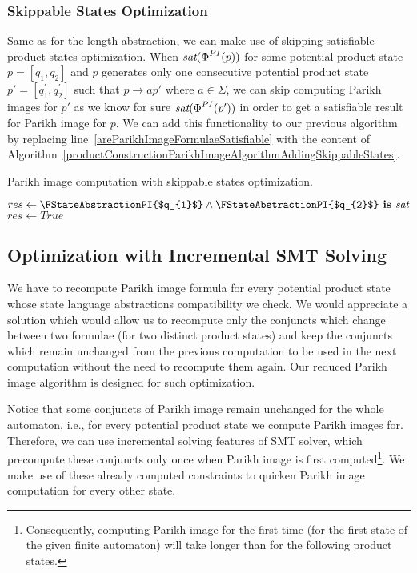 \subsubsection{Skippable States Optimization}

Same as for the length abstraction, we can make use of skipping satisfiable product states optimization. When $\emph{sat}(\emph{$\Phi$}^{PI}(p))$ for some potential product state $p = [q_1, q_2]$ and $p$ generates only one consecutive potential product state $p' = [q^{'}_1, q^{'}_2]$ such that $p \rightarrow{a} p'$ where $ a \in \Sigma $, we can skip computing Parikh images for $p'$ as we know for sure $\emph{sat}(\emph{$\Phi$}^{PI}(p'))$ in order to get a satisfiable result for Parikh image for $p$. We can add this functionality to our previous algorithm by replacing line~\ref{areParikhImageFormulaeSatisfiable} with the content of Algorithm~\ref{productConstructionParikhImageAlgorithmAddingSkippableStates}.

\begin{algorithm}
\caption{Parikh image computation with skippable states optimization.}\label{productConstructionParikhImageAlgorithmAddingSkippableStates}
\DontPrintSemicolon
\BlankLine
     {
        $res \gets \FStateAbstractionPI{$q_{1}$} \land \FStateAbstractionPI{$q_{2}$} \textbf{ is } \emph{sat} $ \;
    } {\label{AlgIsSkippable} %
        $res \gets True$ \;
    }
\end{algorithm}

\subsection{Optimization with Incremental SMT Solving}

We have to recompute Parikh image formula for every potential product state whose state language abstractions compatibility we check. We would appreciate a solution which would allow us to recompute only the conjuncts which change between two formulae (for two distinct product states) and keep the conjuncts which remain unchanged from the previous computation to be used in the next computation without the need to recompute them again. Our reduced Parikh image algorithm is designed for such optimization.

Notice that some conjuncts of Parikh image remain unchanged for the whole automaton, i.e., for every potential product state we compute Parikh images for. Therefore, we can use incremental solving features of SMT solver, which precompute these conjuncts only once when Parikh image is first computed\footnote{Consequently, computing Parikh image for the first time (for the first state of the given finite automaton) will take longer than for the following product states.}. We make use of these already computed constraints to quicken Parikh image computation for every other state.

